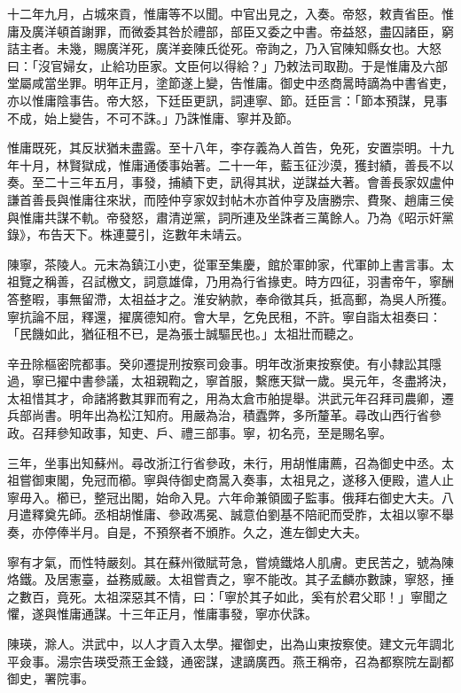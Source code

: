 \begin{pinyinscope}
十二年九月，占城來貢，惟庸等不以聞。中官出見之，入奏。帝怒，敕責省臣。惟庸及廣洋頓首謝罪，而微委其咎於禮部，部臣又委之中書。帝益怒，盡囚諸臣，窮詰主者。未幾，賜廣洋死，廣洋妾陳氏從死。帝詢之，乃入官陳知縣女也。大怒曰：「沒官婦女，止給功臣家。文臣何以得給？」乃敕法司取勘。于是惟庸及六部堂屬咸當坐罪。明年正月，塗節遂上變，告惟庸。御史中丞商暠時謫為中書省吏，亦以惟庸陰事告。帝大怒，下廷臣更訊，詞連寧、節。廷臣言：「節本預謀，見事不成，始上變告，不可不誅。」乃誅惟庸、寧并及節。

惟庸既死，其反狀猶未盡露。至十八年，李存義為人首告，免死，安置崇明。十九年十月，林賢獄成，惟庸通倭事始著。二十一年，藍玉征沙漠，獲封績，善長不以奏。至二十三年五月，事發，捕績下吏，訊得其狀，逆謀益大著。會善長家奴盧仲謙首善長與惟庸往來狀，而陸仲亨家奴封帖木亦首仲亨及唐勝宗、費聚、趙庸三侯與惟庸共謀不軌。帝發怒，肅清逆黨，詞所連及坐誅者三萬餘人。乃為《昭示奸黨錄》，布告天下。株連蔓引，迄數年未靖云。

陳寧，茶陵人。元末為鎮江小吏，從軍至集慶，館於軍帥家，代軍帥上書言事。太祖覽之稱善，召試檄文，詞意雄偉，乃用為行省掾吏。時方四征，羽書帝午，寧酬答整暇，事無留滯，太祖益才之。淮安納款，奉命徵其兵，抵高郵，為吳人所獲。寧抗論不屈，釋還，擢廣德知府。會大旱，乞免民租，不許。寧自詣太祖奏曰：「民饑如此，猶征租不已，是為張士誠驅民也。」太祖壯而聽之。

辛丑除樞密院都事。癸卯遷提刑按察司僉事。明年改浙東按察使。有小隸訟其隱過，寧已擢中書參議，太祖親鞫之，寧首服，繫應天獄一歲。吳元年，冬盡將決，太祖惜其才，命諸將數其罪而宥之，用為太倉市舶提舉。洪武元年召拜司農卿，遷兵部尚書。明年出為松江知府。用嚴為治，積蠹弊，多所釐革。尋改山西行省參政。召拜參知政事，知吏、戶、禮三部事。寧，初名亮，至是賜名寧。

三年，坐事出知蘇州。尋改浙江行省參政，未行，用胡惟庸薦，召為御史中丞。太祖嘗御東閣，免冠而櫛。寧與侍御史商暠入奏事，太祖見之，遂移入便殿，遣人止寧毋入。櫛已，整冠出閣，始命入見。六年命兼領國子監事。俄拜右御史大夫。八月遣釋奠先師。丞相胡惟庸、參政馮冕、誠意伯劉基不陪祀而受胙，太祖以寧不舉奏，亦停俸半月。自是，不預祭者不頒胙。久之，進左御史大夫。

寧有才氣，而性特嚴刻。其在蘇州徵賦苛急，嘗燒鐵烙人肌膚。吏民苦之，號為陳烙鐵。及居憲臺，益務威嚴。太祖嘗責之，寧不能改。其子孟麟亦數諫，寧怒，捶之數百，竟死。太祖深惡其不情，曰：「寧於其子如此，奚有於君父耶！」寧聞之懼，遂與惟庸通謀。十三年正月，惟庸事發，寧亦伏誅。

陳瑛，滁人。洪武中，以人才貢入太學。擢御史，出為山東按察使。建文元年調北平僉事。湯宗告瑛受燕王金錢，通密謀，逮謫廣西。燕王稱帝，召為都察院左副都御史，署院事。


\end{pinyinscope}
